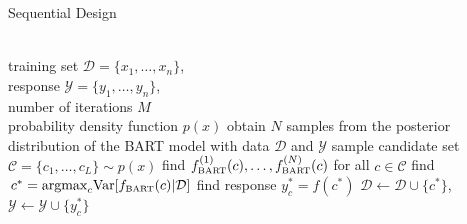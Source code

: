 \begin{algorithm}[tbh!]
  \caption{Sequential Design}
  \label{alg:SQ}
\begin{algorithmic}
  \\training set $\mathcal{D} = \{x_1, \ldots, x_n\}$, \\response $\mathcal{Y} = \{y_1, \ldots, y_n\}$, \\
  number of iterations $M$ \\
  probability density function $p(x)$
  \STATE obtain $N$ samples from the posterior distribution of the BART model with data $\mathcal{D}$ and $\mathcal{Y}$
  \STATE sample candidate set $\mathcal{C} = \{c_1, \ldots, c_L\}\sim p(x)$ 
  \STATE find $f_{\bart}^{(1)}(c), \ldots, f_{\bart}^{(N)}(c)$ for all $c\in\mathcal{C}$
  \STATE find $\,c^* = \mbox{argmax}_{c} \mbox{Var}[f_{\bart}(c)|\mathcal{D}]
	\label{eq:maxvar}$
  \STATE find response $y_c^* = f(c^*)$
  \STATE $\mathcal{D} \leftarrow \mathcal{D}\cup \{c^*\}$, $\mathcal{Y} \leftarrow \mathcal{Y}\cup \{y_c^*\}$
  \ENDFOR
\end{algorithmic}
\end{algorithm}